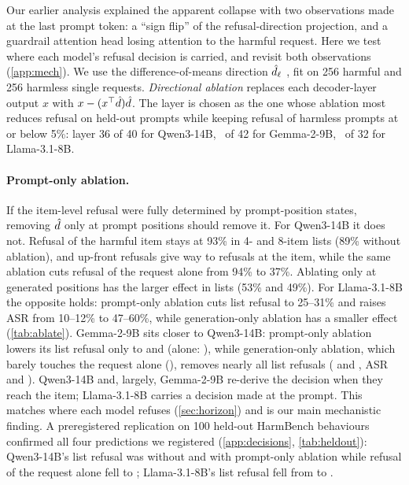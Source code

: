 Our earlier analysis explained the apparent collapse with two observations made at the last prompt token: a
``sign flip'' of the refusal-direction projection, and a guardrail attention head losing attention to the
harmful request. Here we test where each model's refusal decision is carried, and revisit both observations (\cref{app:mech}). We use the difference-of-means direction
$\hat{d}_\ell$ \citep{arditi2024refusal}, fit on 256 harmful and 256 harmless single requests. \emph{Directional
ablation} replaces each decoder-layer output $x$ with $x-(x^\top\hat{d})\hat{d}$. The layer is chosen as the one
whose ablation most reduces refusal on held-out prompts while keeping refusal of harmless prompts at or below
5\%: layer 36 of 40 for Qwen3-14B, \GemmaLayer\ of 42 for Gemma-2-9B, \LlamaLayer\ of 32 for Llama-3.1-8B.

\paragraph{Prompt-only ablation.} If the item-level refusal were fully determined by prompt-position states,
removing $\hat{d}$ only at prompt positions should remove it. For Qwen3-14B it does not. Refusal of the harmful item stays at 93\% in 4- and 8-item
lists (89\% without ablation), and up-front refusals give way to refusals at the item, while the same ablation
cuts refusal of the request alone from 94\% to 37\%. Ablating only at generated positions has the larger effect
in lists (53\% and 49\%). For Llama-3.1-8B the opposite holds: prompt-only ablation cuts list refusal to
25--31\% and raises ASR from 10--12\% to 47--60\%, while generation-only ablation has a smaller effect
(\cref{tab:ablate}). Gemma-2-9B sits closer to Qwen3-14B: prompt-only ablation lowers its list refusal only to \AblGemmaFourPromptRef{} and \AblGemmaEightPromptRef{} (alone: \AblGemmaAlonePromptRef{}), while generation-only ablation, which barely touches the request alone (\AblGemmaAloneGenRef{}), removes nearly all list refusals (\AblGemmaFourGenRef{} and \AblGemmaEightGenRef{}, ASR \AblGemmaFourGenASR{} and \AblGemmaEightGenASR{}). Qwen3-14B and, largely, Gemma-2-9B re-derive the decision when they reach the item; Llama-3.1-8B carries a decision
made at the prompt. This matches where each model refuses (\cref{sec:horizon}) and is our main mechanistic
finding. A preregistered replication on 100 held-out HarmBench behaviours confirmed all four predictions we registered (\cref{app:decisions}, \cref{tab:heldout}): Qwen3-14B's list refusal was \HoQwenListsNoneRef{} without and \HoQwenListsPromptRef{} with prompt-only ablation while refusal of the request alone fell to \HoQwenAlonePromptRef{}; Llama-3.1-8B's list refusal fell from \HoLlamaListsNoneRef{} to \HoLlamaListsPromptRef{}.

